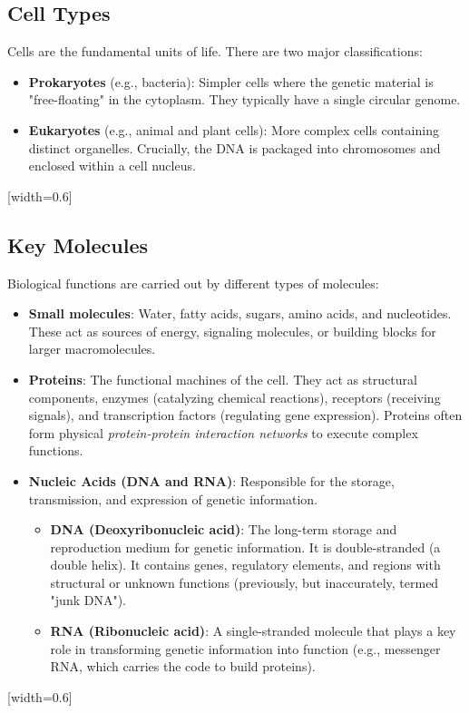 \subsection{Cell Types}
Cells are the fundamental units of life. There are two major classifications:
\begin{itemize}
  \item \textbf{Prokaryotes} (e.g., bacteria): Simpler cells where the genetic material is "free-floating" in the cytoplasm. They typically have a single circular genome.
  \item \textbf{Eukaryotes} (e.g., animal and plant cells): More complex cells containing distinct organelles. Crucially, the DNA is packaged into chromosomes and enclosed within a cell nucleus.
\end{itemize}

[width=0.6\textwidth]

\subsection{Key Molecules}
Biological functions are carried out by different types of molecules:
\begin{itemize}
  \item \textbf{Small molecules}: Water, fatty acids, sugars, amino acids, and nucleotides. These act as sources of energy, signaling molecules, or building blocks for larger macromolecules.
  \item \textbf{Proteins}: The functional machines of the cell. They act as structural components, enzymes (catalyzing chemical reactions), receptors (receiving signals), and transcription factors (regulating gene expression). Proteins often form physical \textit{protein-protein interaction networks} to execute complex functions.
  \item \textbf{Nucleic Acids (DNA and RNA)}: Responsible for the storage, transmission, and expression of genetic information.
  \begin{itemize}
    \item \textbf{DNA (Deoxyribonucleic acid)}: The long-term storage and reproduction medium for genetic information. It is double-stranded (a double helix). It contains genes, regulatory elements, and regions with structural or unknown functions (previously, but inaccurately, termed "junk DNA").
    \item \textbf{RNA (Ribonucleic acid)}: A single-stranded molecule that plays a key role in transforming genetic information into function (e.g., messenger RNA, which carries the code to build proteins).
  \end{itemize}
\end{itemize}
[width=0.6\textwidth]


